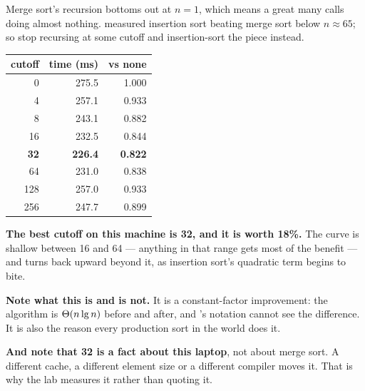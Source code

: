 \begin{worked}
Merge sort's recursion bottoms out at $n = 1$, which means a great many calls
doing almost nothing.  measured insertion sort beating merge sort
below $n \approx 65$; so stop recursing at some cutoff and insertion-sort the
piece instead.

\begin{center}
\begin{tabular}{@{}rrr@{}}
\toprule
\rowcolor{primary!15}
cutoff & time (ms) & vs none \\
\midrule
   0 & 275.5 & 1.000 \\
   4 & 257.1 & 0.933 \\
   8 & 243.1 & 0.882 \\
  16 & 232.5 & 0.844 \\
 \textbf{32} & \textbf{226.4} & \textbf{0.822} \\
  64 & 231.0 & 0.838 \\
 128 & 257.0 & 0.933 \\
 256 & 247.7 & 0.899 \\
\bottomrule
\end{tabular}
\end{center}

\smallskip
\textbf{The best cutoff on this machine is 32, and it is worth 18\%.} The curve
is shallow between 16 and 64 --- anything in that range gets most of the
benefit --- and turns back upward beyond it, as insertion sort's quadratic term
begins to bite.

\smallskip
\textbf{Note what this is and is not.} It is a constant-factor improvement: the
algorithm is $\Theta(n\operatorname{lg} n)$ before and after, and 's
notation cannot see the difference. It is also the reason every production sort
in the world does it.

\smallskip
\textbf{And note that 32 is a fact about this laptop}, not about merge sort.
A different cache, a different element size or a different compiler moves it.
That is why the lab measures it rather than quoting it.
\end{worked}

